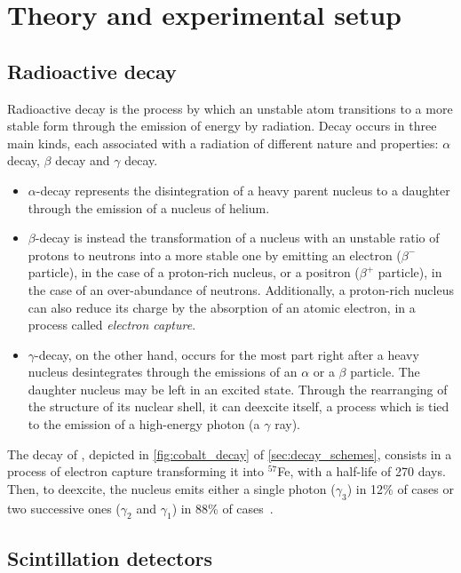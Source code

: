 \section{Theory and experimental setup}
\subsection{Radioactive decay}
\label{sec:radioactivity}

Radioactive decay is the process by which an unstable atom transitions to a more stable form through the emission of energy by radiation.
Decay occurs in three main kinds, each associated with a radiation of different nature and properties: $\alpha$ decay, $\beta$ decay and $\gamma$ decay.
\begin{itemize}
    \item $\alpha$-decay represents the disintegration of a heavy parent nucleus to a daughter through the emission of a nucleus of helium.
    \item $\beta$-decay is instead the transformation of a nucleus with an unstable ratio of protons to neutrons into a more stable one by emitting an electron ($\beta^-$ particle), in the case of a proton-rich nucleus, or a positron ($\beta^+$ particle), in the case of an over-abundance of neutrons.
    Additionally, a proton-rich nucleus can also reduce its charge by the absorption of an atomic electron, in a process called \emph{electron capture}.
    \item $\gamma$-decay, on the other hand, occurs for the most part right after a heavy nucleus desintegrates through the emissions of an $\alpha$ or a $\beta$ particle.
    The daughter nucleus may be left in an excited state. Through the rearranging of the structure of its nuclear shell, it can deexcite itself, 
    a process which is tied to the emission of a high-energy photon (a $\gamma$ ray).
\end{itemize}
The decay of \cobalt, depicted in \autoref{fig:cobalt_decay} 
of \autoref{sec:decay_schemes}, consists in a process of electron capture transforming it into $^{57}$Fe, with a half-life of 270 days.
Then, to deexcite, the nucleus emits 
either a single photon ($\gamma_3$) in 12\% of cases
or two successive ones ($\gamma_2$ and $\gamma_1$) in 88\% of \mbox{cases \cite{notice_VI}.}


\subsection{Scintillation detectors}
\label{sec:scinitillators}

